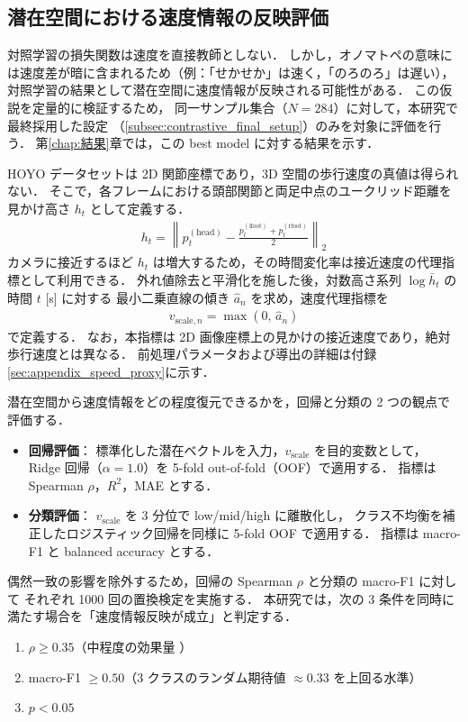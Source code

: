 \subsection{潜在空間における速度情報の反映評価}
\label{subsec:contrastive_speed_reflection_eval}

対照学習の損失関数は速度を直接教師としない．
しかし，オノマトペの意味には速度差が暗に含まれるため（例：「せかせか」は速く，「のろのろ」は遅い），
対照学習の結果として潜在空間に速度情報が反映される可能性がある．
この仮説を定量的に検証するため，
同一サンプル集合（$N=284$）に対して，本研究で最終採用した設定
（\ref{subsec:contrastive_final_setup}）のみを対象に評価を行う．
第\ref{chap:結果}章では，この best model に対する結果を示す．

HOYO データセットは 2D 関節座標であり，3D 空間の歩行速度の真値は得られない．
そこで，各フレームにおける頭部関節と両足中点のユークリッド距離を見かけ高さ $h_t$ として定義する．
\begin{align}
  h_t = \left\| p^{(\mathrm{head})}_t - \frac{p^{(\mathrm{lfoot})}_t + p^{(\mathrm{rfoot})}_t}{2} \right\|_2
\end{align}
カメラに接近するほど $h_t$ は増大するため，その時間変化率は接近速度の代理指標として利用できる．
外れ値除去と平滑化を施した後，対数高さ系列 $\log \bar{h}_t$ の時間 $t$ [s] に対する
最小二乗直線の傾き $\hat{a}_n$ を求め，速度代理指標を
\begin{align}
  v_{\mathrm{scale},n} = \max(0,\, \hat{a}_n)
\end{align}
で定義する．
なお，本指標は 2D 画像座標上の見かけの接近速度であり，絶対歩行速度とは異なる．
前処理パラメータおよび導出の詳細は付録\ref{sec:appendix_speed_proxy}に示す．

潜在空間から速度情報をどの程度復元できるかを，回帰と分類の 2 つの観点で評価する．
\begin{itemize}
  \item \textbf{回帰評価}：
  標準化した潜在ベクトルを入力，$v_{\mathrm{scale}}$ を目的変数として，
  Ridge 回帰（$\alpha=1.0$）を 5-fold out-of-fold（OOF）で適用する．
  指標は Spearman $\rho$，$R^2$，MAE とする．
  \item \textbf{分類評価}：
  $v_{\mathrm{scale}}$ を 3 分位で low/mid/high に離散化し，
  クラス不均衡を補正したロジスティック回帰を同様に 5-fold OOF で適用する．
  指標は macro-F1 と balanced accuracy とする．
\end{itemize}

偶然一致の影響を除外するため，回帰の Spearman $\rho$ と分類の macro-F1 に対して
それぞれ 1000 回の置換検定を実施する．
本研究では，次の 3 条件を同時に満たす場合を「速度情報反映が成立」と判定する．
\begin{enumerate}
  \item $\rho \ge 0.35$（中程度の効果量 \cite{Cohen1988}）
  \item macro-F1 $\ge 0.50$（3 クラスのランダム期待値 $\approx 0.33$ を上回る水準）
  \item $p < 0.05$
\end{enumerate}

